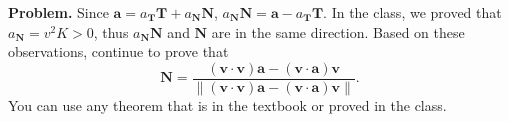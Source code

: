 \documentclass[12pt]{article}
\newcommand{\norm}[1]{\lVert #1 \rVert}
\begin{document}
\noindent
{\bf Problem.}
Since $\mathbf a = a_{\mathbf T}\mathbf T + a_{\mathbf N}\mathbf N$, $a_{\mathbf N}\mathbf N = \mathbf a - a_{\mathbf T}\mathbf T$. In the class, we proved that $a_{\mathbf N} = v^2K > 0$, thus $a_{\mathbf N}\mathbf N$ and $\mathbf N$ are in the same direction. Based on these observations, continue to prove that
\[
	\mathbf N = \frac{\left(\mathbf v\cdot\mathbf v\right)\mathbf a - \left(\mathbf v\cdot\mathbf a\right)\mathbf v}{\norm{\left(\mathbf v\cdot\mathbf v\right)\mathbf a - \left(\mathbf v\cdot\mathbf a\right)\mathbf v}}.
\]
You can use any theorem that is in the textbook or proved in the class.
\end{document}
